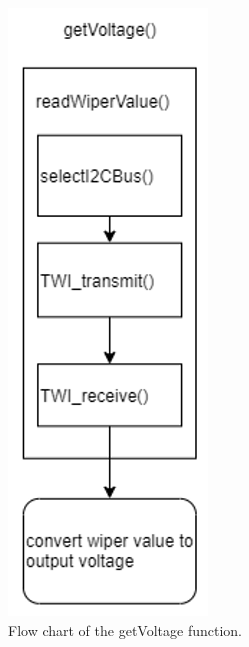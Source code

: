 \section{}\label{sec:software_flowcharts}
\FloatBarrier
\begin{figure}[ht!]
    \centering
    \includegraphics[scale=0.7]{software_getVoltage_flow_chart.png}
    \caption{Flow chart of the getVoltage function.}
    \label{fig:getvoltage}
\end{figure}
\FloatBarrier
